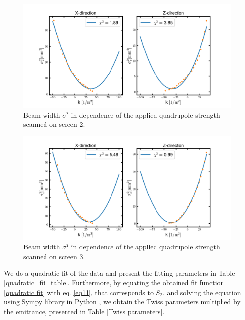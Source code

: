 \documentclass[12pt]{article}
\begin{document}
\begin{figure}[H]
    \centering
    \includegraphics[width = \textwidth]{fig/Quadrupole_2.png}
    \caption{Beam width $\sigma^2$ in dependence of the applied quadrupole strength scanned on screen 2.}
    \label{quadrupole 2}
\end{figure}

\begin{figure}[H]
    \centering
    \includegraphics[width = \textwidth]{fig/Quadrupole_3.png}
    \caption{Beam width $\sigma^2$ in dependence of the applied quadrupole strength scanned on screen 3.}
    \label{quadrupole 3}
\end{figure}

We do a quadratic fit of the data and present the fitting parameters in Table \ref{quadratic_fit_table}. Furthermore, by equating the obtained fit function \ref{quadratic fit} with eq. \ref{eq11}, that corresponds to $S_2$, and solving the equation using Sympy library in Python \cite{sympy}, we obtain the Twiss parameters multiplied by the emittance, presented in Table \ref{Twiss parameters}. 
\end{document}
